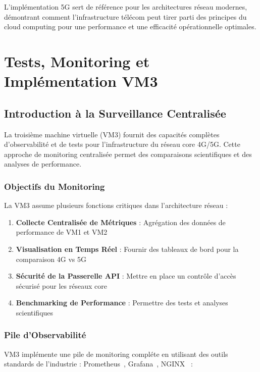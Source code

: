 \documentclass[12pt,a4paper]{report}
\begin{document}
L'implémentation 5G sert de référence pour les architectures réseau modernes, démontrant comment l'infrastructure télécom peut tirer parti des principes du cloud computing pour une performance et une efficacité opérationnelle optimales.

\newpage

\chapter{Tests, Monitoring et Implémentation VM3}

\section{Introduction à la Surveillance Centralisée}

La troisième machine virtuelle (VM3) fournit des capacités complètes d'observabilité et de tests pour l'infrastructure du réseau core 4G/5G. Cette approche de monitoring centralisée permet des comparaisons scientifiques et des analyses de performance.

\subsection{Objectifs du Monitoring}

La VM3 assume plusieurs fonctions critiques dans l'architecture réseau :

\begin{enumerate}
    \item \textbf{Collecte Centralisée de Métriques} : Agrégation des données de performance de VM1 et VM2
    \item \textbf{Visualisation en Temps Réel} : Fournir des tableaux de bord pour la comparaison 4G vs 5G
    \item \textbf{Sécurité de la Passerelle API} : Mettre en place un contrôle d'accès sécurisé pour les réseaux core
    \item \textbf{Benchmarking de Performance} : Permettre des tests et analyses scientifiques
\end{enumerate}

\subsection{Pile d'Observabilité}

VM3 implémente une pile de monitoring compléte en utilisant des outils standards de l'industrie : Prometheus~\cite{prometheus-docs}, Grafana~\cite{grafana-docs}, NGINX~\cite{nginx-docs} :
\end{document}
